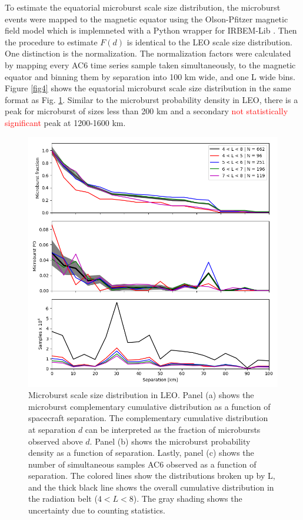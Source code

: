 \documentclass[draft]{agujournal2019}
\begin{document}
To estimate the equatorial microburst scale size distribution, the microburst events were mapped to the magnetic equator using the Olson-Pfitzer magnetic field model \cite{Olson1982} which is implemneted with a Python wrapper for IRBEM-Lib \cite{irbem}. Then the procedure to estimate $F(d)$ is identical to the LEO scale size distribution. One distinction is the normalization. The normalization factors were calculated by mapping every AC6 time series sample taken simultaneously, to the magnetic equator and binning them by separation into 100 km wide, and one L wide bins. Figure \ref{fig4} shows the equatorial microburst scale size distribution in the same format as Fig. \ref{fig3}. Similar to the microburst probability density in LEO, there is a peak for microburst of sizes less than 200 km and a secondary \textcolor{red}{not statistically significant} peak at 1200-1600 km.

\begin{figure}
\includegraphics[width=\textwidth]{fig3.png}
\caption{Microburst scale size distribution in LEO. Panel (a) shows the microburst complementary cumulative distribution as a function of spacecraft separation. The complementary cumulative distribution at separation $d$ can be interpreted as the fraction of microbursts observed above $d$. Panel (b) shows the microburst probability density as a function of separation. Lastly, panel (c) shows the number of simultaneous samples AC6 observed as a function of separation. The colored lines show the distributions broken up by L, and the thick black line shows the overall cumulative distribution in the radiation belt ($4 < L < 8$). The gray shading shows the uncertainty due to counting statistics.}
\label{fig3}
\end{figure}
\end{document}
